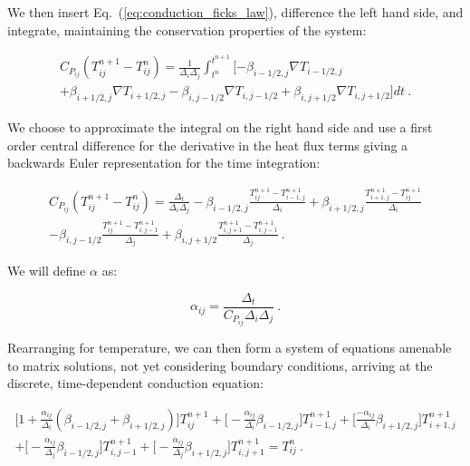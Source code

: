 \documentclass[letterpaper,12pt]{article}
\begin{document}
We then insert Eq.~(\ref{eq:conduction_ficks_law}), difference the
left hand side, and integrate, maintaining the conservation properties
of the system:

\begin{multline}
  C_{P_{ij}} ( T^{n+1}_{ij} - T^n_{ij} ) = \frac{1}{\Delta_i \Delta_j}
  \int_{t^n}^{t^{n+1}} [ -\beta_{i-1/2,j} \nabla T_{i-1/2,j}\\
    + \beta_{i+1/2,j} \nabla T_{i+1/2,j} - \beta_{i,j-1/2} \nabla
    T_{i,j-1/2} +\beta_{i,j+1/2} \nabla T_{i,j+1/2} ] dt\:.
  \label{eq:conduction_time_integral}
\end{multline}

We choose to approximate the integral on the right hand side and use a
first order central difference for the derivative in the heat flux
terms giving a backwards Euler representation for the time
integration:

\begin{multline}
  C_{P_{ij}}( T^{n+1}_{ij} - T^n_{ij} ) = \frac{\Delta_t}{\Delta_i
    \Delta_j} -\beta_{i-1/2,j} \frac{T^{n+1}_{ij}
    -T^{n+1}_{i-1,j}}{\Delta_i} +\beta_{i+1/2,j} \frac{T^{n+1}_{i+1,j}
    -T^{n+1}_{ij}}{\Delta_i}\\
  -\beta_{i,j-1/2} \frac{T^{n+1}_{ij}
    -T^{n+1}_{i,j-1}}{\Delta_j} +\beta_{i,j+1/2} \frac{T^{n+1}_{i,j+1}
    -T^{n+1}_{i,j-1}}{\Delta_j}\:.
  \label{eq:conduction_fv_multline}
\end{multline}

We will define $\alpha$ as:

\begin{equation}
  \alpha_{ij} = \frac{\Delta_t}{C_{P_{ij}} \Delta_i \Delta_j}
  \label{eq:conduction_coeff}\:.
\end{equation}

Rearranging for temperature, we can then form a system of equations
amenable to matrix solutions, not yet considering boundary conditions,
arriving at the discrete, time-dependent conduction equation:

\begin{multline}
 \Big[1 + \frac{\alpha_{ij}}{\Delta_i}(\beta_{i-1/2,j} + \beta_{i+1/2,j})\Big]
 T^{n+1}_{ij} + \Big[-\frac{\alpha_{ij}}{\Delta_i} \beta_{i-1/2,j}\Big]
 T^{n+1}_{i-1,j} + \Big[\frac{-\alpha_{ij}}{\Delta_i} \beta_{i+1/2,j}\Big]
 T^{n+1}_{i+1,j}\\
 + \Big[-\frac{\alpha_{ij}}{\Delta_j} \beta_{i-1/2,j}\Big]
 T^{n+1}_{i,j-1} + \Big[-\frac{\alpha_{ij}}{\Delta_j} \beta_{i+1/2,j}\Big]
 T^{n+1}_{i,j+1} = T^n_{ij}\:.
 \label{eq:conduction_inner_terms}
\end{multline}
\end{document}
